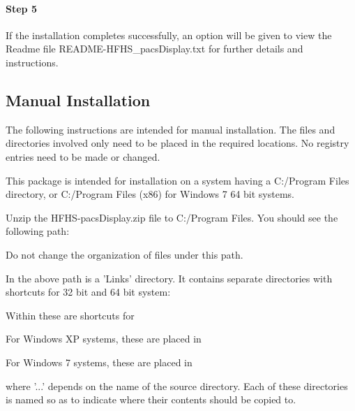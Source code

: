 \paragraph{Step 5} If the installation completes successfully, an option will be given to view the Readme file \textnormal{README-HFHS\_pacsDisplay.txt} for further details and instructions. 

\subsection{Manual Installation}
\label{sec:maninstall}

The following instructions are intended for manual installation. The files and directories involved only need to be placed in the required locations. No registry entries need to be made or changed. 

This package is intended for installation on a system having a \textnormal{C:/Program Files} directory, or \textnormal{C:/Program Files (x86)} for Windows 7 64 bit systems. 

Unzip the \textnormal{HFHS-pacsDisplay.zip} file to \textnormal{C:/Program Files}. You should see the following path: 


 Do not change the organization of files under this path. 

In the above path is a 'Links' directory. It contains separate directories with shortcuts for 32 bit and 64 bit system: 


Within these are shortcuts for 


For Windows XP systems, these are placed in 


For Windows 7 systems, these are placed in 


where '\textnormal{...}' depends on the name of the source directory. Each of these directories is named so as to indicate where their contents should be copied to. 

